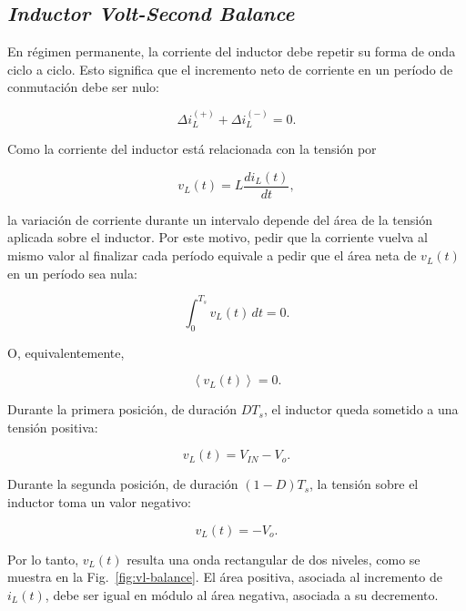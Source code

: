 \documentclass[a4paper,12pt]{article}
\begin{document}
\subsection{\textit{Inductor Volt-Second Balance}}

En régimen permanente, la corriente del inductor debe repetir su forma de onda ciclo a ciclo. Esto significa que el incremento neto de corriente en un período de conmutación debe ser nulo:

\begin{equation}
    \Delta i_L^{(+)} + \Delta i_L^{(-)} = 0.
\end{equation}

Como la corriente del inductor está relacionada con la tensión por

\begin{equation}
    v_L(t) = L \frac{di_L(t)}{dt},
\end{equation}

la variación de corriente durante un intervalo depende del área de la tensión aplicada sobre el inductor. Por este motivo, pedir que la corriente vuelva al mismo valor al finalizar cada período equivale a pedir que el área neta de $v_L(t)$ en un período sea nula:

\begin{equation}
    \int_0^{T_s} v_L(t)\,dt = 0.
\end{equation}

O, equivalentemente,

\begin{equation}
    \left< v_L(t) \right> = 0.
\end{equation}

Durante la primera posición, de duración $D T_s$, el inductor queda sometido a una tensión positiva:

\begin{equation}
    v_L(t) = V_{IN} - V_o.
\end{equation}

Durante la segunda posición, de duración $(1-D)T_s$, la tensión sobre el inductor toma un valor negativo:

\begin{equation}
    v_L(t) = -V_o.
\end{equation}

Por lo tanto, $v_L(t)$ resulta una onda rectangular de dos niveles, como se muestra en la Fig.~\ref{fig:vl-balance}. El área positiva, asociada al incremento de $i_L(t)$, debe ser igual en módulo al área negativa, asociada a su decremento.
\end{document}
